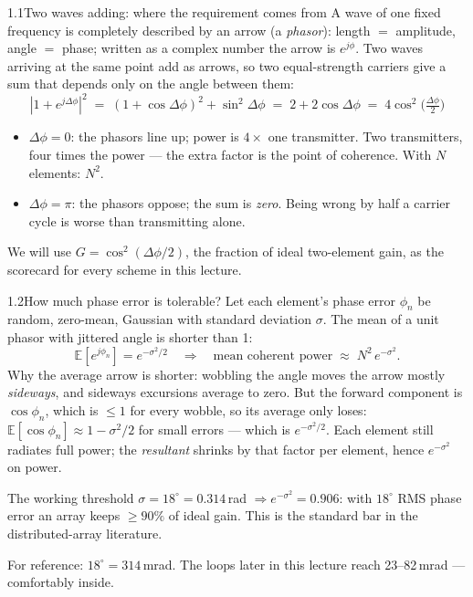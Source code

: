 \documentclass[10pt]{beamer}
\newcommand{\E}{\mathbb{E}}
\newcommand{\srcline}[1]{\par\vfill\noindent{\tiny\textcolor{gray}{Source: #1}}}
\begin{document}
\begin{frame}{1.1\quad Two waves adding: where the requirement comes from}
A wave of one fixed frequency is completely described by an arrow (a
\emph{phasor}): length $=$ amplitude, angle $=$ phase; written as a
complex number the arrow is $e^{j\phi}$. Two waves arriving at the same
point add as arrows, so two equal-strength carriers give a sum that
depends only on the angle between them:
\[
|1+e^{j\Delta\phi}|^2 \;=\; (1{+}\cos\Delta\phi)^2+\sin^2\Delta\phi
\;=\; 2+2\cos\Delta\phi \;=\; 4\cos^2\!\big(\tfrac{\Delta\phi}{2}\big)
\]
\begin{itemize}
\item $\Delta\phi=0$: the phasors line up; power is $4\times$ one
transmitter. Two transmitters, four times the power --- the extra factor
is the point of coherence. With $N$ elements: $N^2$.
\item $\Delta\phi=\pi$: the phasors oppose; the sum is \emph{zero}.
Being wrong by half a carrier cycle is worse than transmitting alone.
\end{itemize}
\vspace{1ex}
We will use $G=\cos^2(\Delta\phi/2)$, the fraction of ideal two-element
gain, as the scorecard for every scheme in this lecture.
\srcline{Elementary phasor arithmetic.}
\end{frame}

\begin{frame}{1.2\quad How much phase error is tolerable?}
Let each element's phase error $\phi_n$ be random, zero-mean, Gaussian
with standard deviation $\sigma$. The mean of a unit phasor with jittered
angle is shorter than 1:
\[
\E[e^{j\phi_n}]=e^{-\sigma^2/2}
\quad\Longrightarrow\quad
\text{mean coherent power}\;\approx\;N^2\,e^{-\sigma^2}.
\]
Why the average arrow is shorter: wobbling the angle moves the arrow
mostly \emph{sideways}, and sideways excursions average to zero. But the
forward component is $\cos\phi_n$, which is $\le1$ for every wobble, so
its average only loses: $\E[\cos\phi_n]\approx1-\sigma^2/2$ for small
errors --- which is $e^{-\sigma^2/2}$. Each element still radiates full
power; the \emph{resultant} shrinks by that factor per element, hence
$e^{-\sigma^2}$ on power.
\vspace{1ex}
\begin{block}{The working threshold}
$\sigma=18^\circ=0.314$\,rad $\Rightarrow e^{-\sigma^2}=0.906$: with
$18^\circ$ RMS phase error an array keeps ${\ge}90\%$ of ideal gain.
This is the standard bar in the distributed-array literature.
\end{block}
For reference: $18^\circ=314$\,mrad. The loops later in this lecture
reach 23--82\,mrad --- comfortably inside.
\srcline{Threshold: Nanzer et al., IEEE TMTT 65(5), 2017 --- [RN23]'s reference [4], used throughout it.}
\end{frame}
\end{document}
